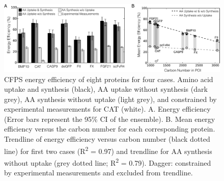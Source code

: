 \documentclass[journal=asbcd6,manuscript=article]{achemso}
\begin{document}
\begin{figure}[t!]
\centering
\includegraphics[width=1.00\textwidth]{./Figures/Energy.pdf}
\caption{CFPS energy efficiency of eight proteins for four cases. Amino acid uptake and synthesis (black), AA uptake without synthesis (dark grey), AA synthesis without uptake (light grey), and constrained by experimental measurements for CAT (white). A. Energy efficiency (Error bars represent the 95\% CI of the ensemble). B. Mean energy efficiency versus the carbon number for each corresponding protein. Trendline of energy efficiency versus carbon number (black dotted line) for first two cases  (R\textsuperscript{2} = 0.97) and trendline for AA synthesis without uptake (grey dotted line; R\textsuperscript{2} = 0.79). Dagger: constrained by experimental measurements and excluded from trendline.}
\label{fig:Energy}
\end{figure}
\end{document}
